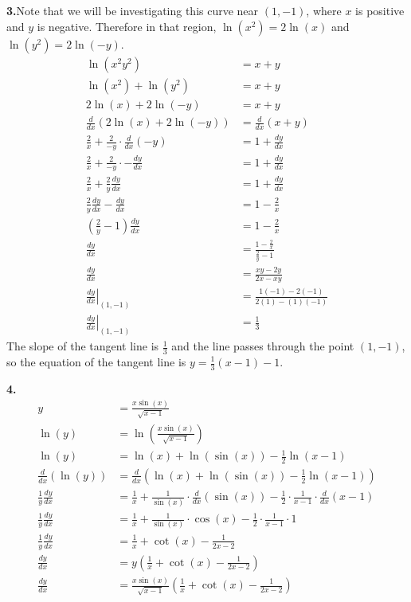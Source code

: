 \documentclass[10pt,oneside,]{book}
\theoremstyle{plain}
\theoremstyle{definition}
\numberwithin{equation}{section}
\newcommand{\fe}[2]{#1\mathopen{}\left(#2\right)\mathclose{}}
\newcommand{\point}[2]{\left(#1,#2\right)}
\newcommand{\lz}[2]{\frac{d#1}{d#2}}
\newcommand{\lzoo}[2]{{\frac{d}{d#1}}{\left(#2\right)}}
\newcommand{\lzoa}[3]{\left.{\frac{d#1}{d#2}}\right|_{#3}}
\begin{document}
\par\smallskip
\noindent\textbf{3.}\quad{}Note that we will be investigating this curve near \(\point{1}{-1}\), where \(x\) is positive and \(y\) is negative. Therefore in that region, \(\fe{\ln}{x^2}=2\fe{\ln}{x}\) and \(\fe{\ln}{y^2}=2\fe{\ln}{-y}\).\begin{align*}
\fe{\ln}{x^2y^2}&=x+y\\
\fe{\ln}{x^2}+\fe{\ln}{y^2}&=x+y\\
2\fe{\ln}{x}+2\fe{\ln}{-y}&=x+y\\
\lzoo{x}{2\fe{\ln}{x}+2\fe{\ln}{-y}}&=\lzoo{x}{x+y}\\
\frac{2}{x}+\frac{2}{-y}\cdot\lzoo{x}{-y}&=1+\lz{y}{x}\\
\frac{2}{x}+\frac{2}{-y}\cdot-\lz{y}{x}&=1+\lz{y}{x}\\
\frac{2}{x}+\frac{2}{y}\lz{y}{x}&=1+\lz{y}{x}\\
\frac{2}{y}\lz{y}{x}-\lz{y}{x}&=1-\frac{2}{x}\\
\left(\frac{2}{y}-1\right)\lz{y}{x}&=1-\frac{2}{x}\\
\lz{y}{x}&=\frac{1-\frac{2}{x}}{\frac{2}{y}-1}\\
\lz{y}{x}&=\frac{xy-2y}{2x-xy}\\
\lzoa{y}{x}{\point{1}{-1}}&=\frac{1(-1)-2(-1)}{2(1)-(1)(-1)}\\
\lzoa{y}{x}{\point{1}{-1}}&=\frac{1}{3}
\end{align*}The slope of the tangent line is \(\frac{1}{3}\) and the line passes through the point \(\point{1}{-1}\), so the equation of the tangent line is \(y=\frac{1}{3}(x-1)-1\).%
\par\smallskip
\noindent\textbf{4.}\quad{}\begin{align*}
y&=\frac{x\fe{\sin}{x}}{\sqrt{x-1}}\\
\fe{\ln}{y}&=\fe{\ln}{\frac{x\fe{\sin}{x}}{\sqrt{x-1}}}\\
\fe{\ln}{y}&=\fe{\ln}{x}+\fe{\ln}{\fe{\sin}{x}}-\frac{1}{2}\fe{\ln}{x-1}\\
\lzoo{x}{\fe{\ln}{y}}&=\lzoo{x}{\fe{\ln}{x}+\fe{\ln}{\fe{\sin}{x}}-\frac{1}{2}\fe{\ln}{x-1}}\\
\frac{1}{y}\lz{y}{x}&=\frac{1}{x}+\frac{1}{\fe{\sin}{x}}\cdot\lzoo{x}{\fe{\sin}{x}}-\frac{1}{2}\cdot\frac{1}{x-1}\cdot\lzoo{x}{x-1}\\
\frac{1}{y}\lz{y}{x}&=\frac{1}{x}+\frac{1}{\fe{\sin}{x}}\cdot\fe{\cos}{x}-\frac{1}{2}\cdot\frac{1}{x-1}\cdot1\\
\frac{1}{y}\lz{y}{x}&=\frac{1}{x}+\fe{\cot}{x}-\frac{1}{2x-2}\\
\lz{y}{x}&=y\left(\frac{1}{x}+\fe{\cot}{x}-\frac{1}{2x-2}\right)\\
\lz{y}{x}&=\frac{x\fe{\sin}{x}}{\sqrt{x-1}}\left(\frac{1}{x}+\fe{\cot}{x}-\frac{1}{2x-2}\right)
\end{align*}%
\end{document}

